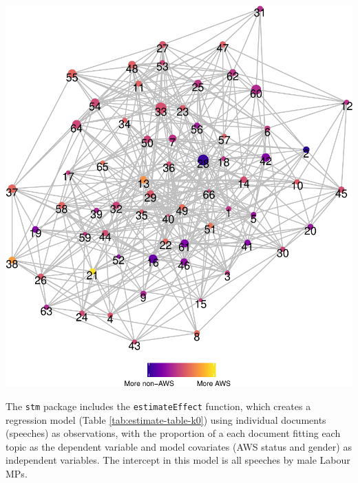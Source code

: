 \documentclass[]{article}
\let\origfigure\figure
\let\endorigfigure\endfigure
\renewenvironment{figure}[1][2] {
    \expandafter\origfigure\expandafter[H]
} {
    \endorigfigure
}
\theoremstyle{definition}
\theoremstyle{definition}
\theoremstyle{definition}
\theoremstyle{remark}
\begin{document}
\begin{figure}
\centering
\includegraphics{methodology_files/figure-latex/stm-network-graph-1.pdf}
\caption{\label{fig:stm-network-graph}Fruchterman-Reingold plot of Topic
Network}
\end{figure}

The \texttt{stm} package includes the \texttt{estimateEffect} function,
which creates a regression model (Table \ref{tab:estimate-table-k0})
using individual documents (speeches) as observations, with the
proportion of a each document fitting each topic as the dependent
variable and model covariates (AWS status and gender) as independent
variables. The intercept in this model is all speeches by male Labour
MPs.
\end{document}
